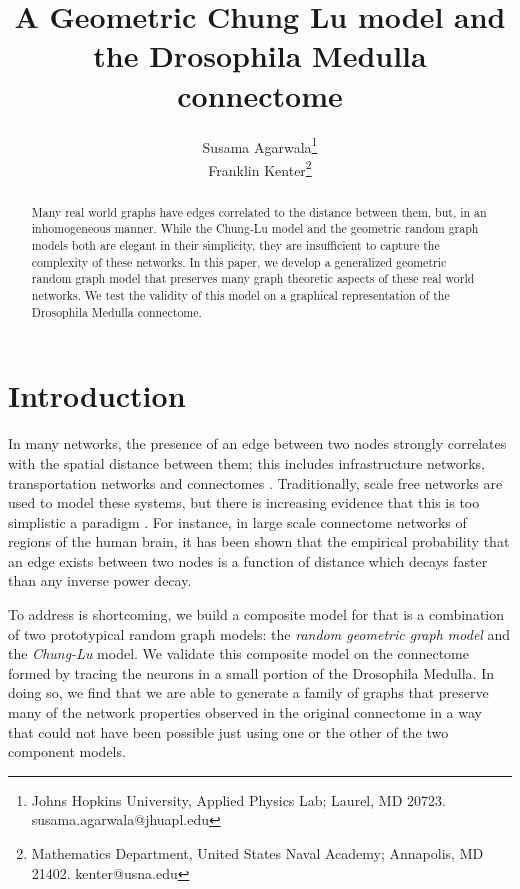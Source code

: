 \documentclass[11]{article}
\title{A Geometric Chung Lu model and the Drosophila Medulla connectome}
\author{Susama Agarwala\footnote{Johns Hopkins University, Applied Physics Lab; Laurel, MD 20723. susama.agarwala@jhuapl.edu}\\
        Franklin Kenter\footnote{Mathematics Department, United States Naval Academy; Annapolis, MD 21402. kenter@usna.edu} \\
}
\date{}
\theoremstyle{remark}
\theoremstyle{definition}
\begin{document}
\maketitle


\begin{abstract}
    Many real world graphs have edges correlated to the distance between them, but, in an inhomogeneous manner. While the Chung-Lu model and the geometric random graph models both are elegant in their simplicity, they are insufficient to capture the complexity of these networks. In this paper, we develop a generalized geometric random graph model that preserves many graph theoretic aspects of these real world networks. We test the validity of this model on a graphical representation of the Drosophila Medulla connectome.
\end{abstract}




\section{Introduction}

In many networks, the presence of an edge between two nodes strongly correlates with the spatial distance between them; this includes infrastructure networks,  transportation networks \cite{spatialsurvey} and connectomes \cite{marmoset,humanspatialconnectome}. Traditionally, scale free networks are used to model these systems, but there is increasing evidence that this is too simplistic  a paradigm \cite{powerlawscarce}. For instance, in large scale connectome networks of regions of the human brain, it has been shown that the empirical probability that an edge exists between two nodes is a function of distance which decays faster than any inverse power decay\cite{humanspatialconnectome}.

To address is shortcoming, we build a composite model for  that is a combination of  two prototypical random graph models: the {\it random geometric graph model} and the {\it Chung-Lu} model. We validate this composite model on the connectome formed by tracing the neurons in a small portion of the Drosophila Medulla\cite{neurodata}. In doing so, we find that we are able to generate a family of graphs that preserve many of the network properties observed in the original connectome in a way that could not have been possible just using one or the other of the two component models. 
\end{document}
